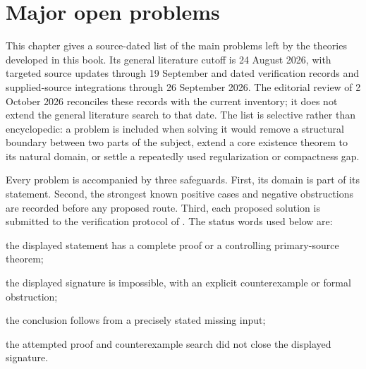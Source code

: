 \chapter{Major open problems}
\label{chap:major-open-problems}

This chapter gives a source-dated list of the main problems left by the
theories developed in this book.  Its general literature cutoff is
24 August 2026, with targeted source updates through 19 September and
dated verification records and supplied-source integrations through
26 September 2026.  The editorial review of 2 October 2026 reconciles
these records with the current inventory; it does not extend the general
literature search to that date.  The list is
selective rather than encyclopedic: a problem is included when solving it
would remove a structural boundary between two parts of the subject, extend a
core existence theorem to its natural domain, or settle a repeatedly used
regularization or compactness gap.

Every problem is accompanied by three safeguards.  First, its domain is part
of its statement.  Second, the strongest known positive cases and negative
obstructions are recorded before any proposed route.  Third, each proposed
solution is submitted to the verification protocol of
.  The status words used below are:

\begin{description}[style=nextline,leftmargin=1.5em,labelindent=0pt,
  itemsep=.45\baselineskip,font=\normalfont\bfseries]
\item[Verified] the displayed statement has a complete proof or a controlling
primary-source theorem;
\item[Disproved] the displayed signature is impossible, with an explicit
counterexample or formal obstruction;
\item[Conditional] the conclusion follows from a precisely stated missing
input;
\item[Open] the attempted proof and counterexample search did not close the
displayed signature.
\end{description}

